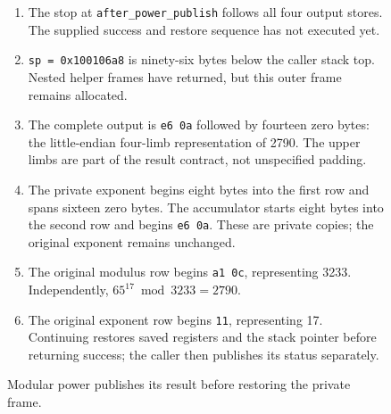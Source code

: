 \begin{figure}[htbp]
  \par\smallskip
  \begin{minipage}{\linewidth}
    \small
    \begin{enumerate}
      \setlength{\itemsep}{0pt}
            \setlength{\parsep}{0pt}
      \item The stop at \texttt{after\_power\_publish} follows all four output stores. The supplied success and restore sequence has not executed yet.
      \item \texttt{sp = 0x100106a8} is ninety-six bytes below the caller stack top. Nested helper frames have returned, but this outer frame remains allocated.
      \item The complete output is \texttt{e6 0a} followed by fourteen zero bytes: the little-endian four-limb representation of 2790. The upper limbs are part of the result contract, not unspecified padding.
      \item The private exponent begins eight bytes into the first row and spans sixteen zero bytes. The accumulator starts eight bytes into the second row and begins \texttt{e6 0a}. These are private copies; the original exponent remains unchanged.
      \item The original modulus row begins \texttt{a1 0c}, representing 3233. Independently, \mbox{$65^{17}\bmod 3233=2790$}.
      \item The original exponent row begins \texttt{11}, representing 17. Continuing restores saved registers and the stack pointer before returning success; the caller then publishes its status separately.
    \end{enumerate}
  \end{minipage}
  \caption{Modular power publishes its result before restoring the private frame.}
  \label{capture:027-rsa-arithmetic-f04}
  \label{rsa-f04}
\end{figure}
\par
